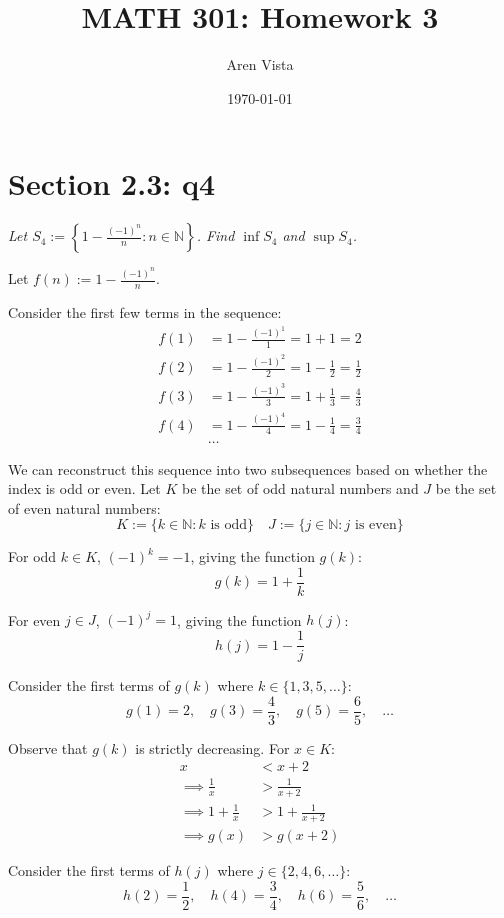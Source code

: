 \documentclass[11pt]{article}
\title{ MATH 301: Homework 3}
\author{ Aren Vista }
\date{\today}
\newcommand{\question}[1]{
    \begin{mdframed}[
        linecolor=gray,       %
        linewidth=0.5pt,      %
        innertopmargin=10pt,  %
        innerbottommargin=10pt %
    ]
    \centering \itshape \color{gray} #1
    \end{mdframed}
}
\theoremstyle{plain}
\begin{document}
 \maketitle \pagebreak
\section*{Section 2.3: q4}
\question{Let $S_4 := \left\{ 1- \frac{(-1)^n}{n} : n \in \mathbb{N} \right\}$. Find $\inf S_4$ and $\sup S_4$.}

Let $f(n) := 1- \frac{(-1)^n}{n}$.

Consider the first few terms in the sequence:
$$
	\begin{aligned}
		f(1) & = 1- \frac{(-1)^1}{1} = 1+1 = 2                     \\
		f(2) & = 1- \frac{(-1)^2}{2} = 1-\frac{1}{2} = \frac{1}{2} \\
		f(3) & = 1- \frac{(-1)^3}{3} = 1+\frac{1}{3} = \frac{4}{3} \\
		f(4) & = 1- \frac{(-1)^4}{4} = 1-\frac{1}{4} = \frac{3}{4} \\
		     & \dots
	\end{aligned}
$$

We can reconstruct this sequence into two subsequences based on whether the index is odd or even.
Let $K$ be the set of odd natural numbers and $J$ be the set of even natural numbers:
$$ K := \{ k \in \mathbb{N} : k \text{ is odd} \} \quad J := \{ j \in \mathbb{N} : j \text{ is even} \} $$

For odd $k \in K$, $(-1)^k = -1$, giving the function $g(k)$:
$$ g(k) = 1 + \frac{1}{k} $$

For even $j \in J$, $(-1)^j = 1$, giving the function $h(j)$:
$$ h(j) = 1 - \frac{1}{j} $$

Consider the first terms of $g(k)$ where $k \in \{1, 3, 5, \dots\}$:
$$ g(1) = 2, \quad g(3) = \frac{4}{3}, \quad g(5) = \frac{6}{5}, \quad \dots $$

Observe that $g(k)$ is strictly decreasing. For $x \in K$:
$$
	\begin{aligned}
		x                      & < x+2             \\
		\implies \frac{1}{x}   & > \frac{1}{x+2}   \\
		\implies 1+\frac{1}{x} & > 1+\frac{1}{x+2} \\
		\implies g(x)          & > g(x+2)
	\end{aligned}
$$

Consider the first terms of $h(j)$ where $j \in \{2, 4, 6, \dots\}$:
$$ h(2) = \frac{1}{2}, \quad h(4) = \frac{3}{4}, \quad h(6) = \frac{5}{6}, \quad \dots $$
\end{document}
